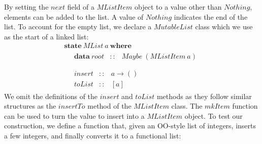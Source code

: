 \documentclass[runningheads,a4paper]{llncs}
\begin{document}
By setting the $\mathit{next}$ field of a $\mathit{MListItem}$ object to a value other than $\mathit{Nothing}$, elements can be added to the list. A value of $\mathit{Nothing}$ indicates the end of the list. To account for the empty list, we declare a $\mathit{MutableList}$ class which we use as the start of a linked list:
\begin{displaymath}
\begin{array}{l}
\mathbf{state}~\mathit{MList}~a~\mathbf{where} \\
\quad \begin{array}{lcl}
\mathbf{data}~\mathit{root}  & :: & \mathit{Maybe}~(\mathit{MListItem}~a)
\end{array}\\\\
\quad \begin{array}{lcl}
\mathit{insert} & :: & a \to () \\
\mathit{toList} & :: & [a]
\end{array}
\end{array}
\end{displaymath}
We omit the definitions of the $\mathit{insert}$ and $\mathit{toList}$ methods as they follow similar structures as the $\mathit{insertTo}$ method of the $\mathit{MListItem}$ class. The $\mathit{mkItem}$ function can be used to turn the value to insert into a $\mathit{MListItem}$ object. To test our construction, we define a function that, given an OO-style list of integers, inserts a few integers, and finally converts it to a functional list:
\end{document}
